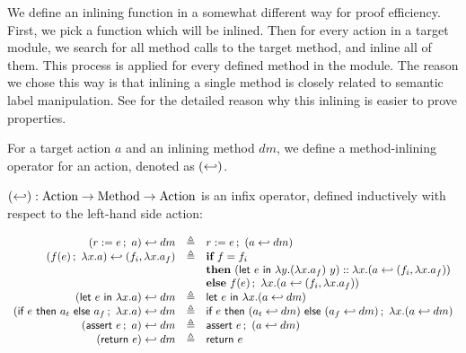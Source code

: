 We define an inlining function in a somewhat different way for proof
efficiency. First, we pick a function which will be inlined. Then for
every action in a target module, we search for all method calls to the
target method, and inline all of them. This process is applied for
every defined method in the module. The reason we chose this way is
that inlining a single method is closely related to semantic label
manipulation. See  for the detailed reason
why this inlining is easier to prove properties.

For a target action $a$ and an inlining method $dm$, we define a
method-inlining operator for an action, denoted as $(\inlinedmsymb)$.

\begin{definition}
  \label{def-inlinedm}
  $(\inlinedmsymb) : \textrm{Action} \to \textrm{Method} \to
  \textrm{Action}$ is an infix operator, defined inductively with
  respect to the left-hand side action:
  \begin{center}
    \begin{math}
      \begin{array}{rcl}
        \inlinedm{(\actwrite{r}{e}{a})}{dm} & \triangleq &
        \actwrite{r}{e}{(\inlinedm{a}{dm})} \\
        \inlinedm{(\actcall{x}{f}{e}{a})}{(f_i, \lambda x.a_f)} & \triangleq &
        \pgmif{} f = f_i \\
        & & \pgmthen{} \concataction{(\actlet{e}{y}{(\lambda x.a_f)\ y})}{(\inlinedm{a}{(f_i, \lambda x.a_f)})} \\
        & & \pgmelse{} \actcall{x}{f}{e}{(\inlinedm{a}{(f_i, \lambda x.a_f)})} \\
        \inlinedm{(\actlet{e}{x}{a})}{dm} & \triangleq &
        \actlet{e}{x}{(\inlinedm{a}{dm})} \\
        \inlinedm{(\actifelse{e}{a_t}{a_f}{x}{a})}{dm} & \triangleq &
        \actifelse{e}{(\inlinedm{a_t}{dm})}{(\inlinedm{a_f}{dm})}{x}{(\inlinedm{a}{dm})} \\
        \inlinedm{(\actassert{e}{a})}{dm} & \triangleq &
        \actassert{e}{(\inlinedm{a}{dm})} \\
        \inlinedm{(\actret{e})}{dm} & \triangleq & \actret{e} \\
      \end{array}
    \end{math}
  \end{center}
\end{definition}

